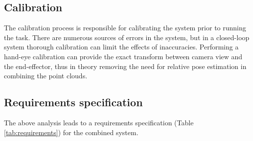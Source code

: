 \subsection{Calibration}
The calibration process is responsible for calibrating the system prior to running the task. There are numerous sources of errors in the system, but in a closed-loop system thorough calibration can limit the effects of inaccuracies. Performing a hand-eye calibration can provide the exact transform between camera view and the end-effector, thus in theory removing the need for relative pose estimation in combining the point clouds.


\subsection{Requirements specification}
The above analysis leads to a requirements specification (Table \ref{tab:requirements}) for the combined system.

